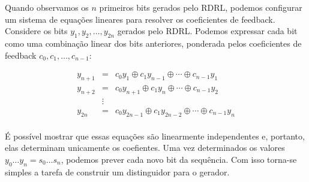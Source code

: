 Quando observamos os $n$ primeiros bits gerados pelo RDRL, podemos configurar um sistema de equações lineares para resolver os coeficientes de feedback.
Considere os bits $y_1, y_2, \dots, y_{2n}$ gerados pelo RDRL.
Podemos expressar cada bit como uma combinação linear dos bits anteriores, ponderada pelos coeficientes de feedback $c_0, c_1, \dots, c_{n-1}$:

\begin{displaymath}
  \begin{array}{rcl}
    y_{n+1} & = & c_0y_1 \oplus c_1y_{n-1} \oplus \cdots \oplus c_{n-1} y_1 \\
    y_{n+2} & = & c_0y_{n+1} \oplus c_1y_n \oplus \cdots \oplus c_{n-1} y_2 \\
    & \vdots & \\
    y_{2n} & = & c_0y_{2n-1} \oplus c_1y_{2n-2} \oplus \cdots \oplus c_{n-1} y_n \\
  \end{array}
\end{displaymath}

É possível mostrar que essas equações são linearmente independentes e, portanto, elas determinam unicamente os coefientes.
Uma vez determinados os valores $y_0 \dots y_n = s_0 \dots s_n$, podemos prever cada novo bit da sequência.
Com isso torna-se simples a tarefa de construir um distinguidor para o gerador.

